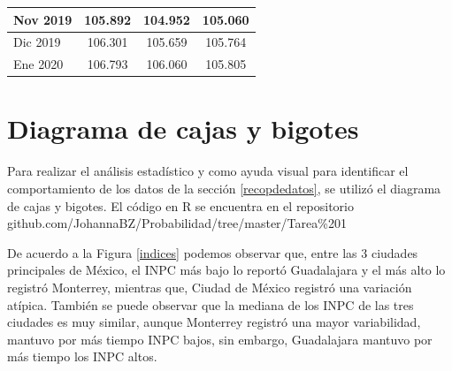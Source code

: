 \documentclass[fontsize=12pt]{article}
\begin{document}
\begin{table}[htp]
\begin{tabular}{|l|c|c|c|}
Nov 2019                             & 105.892            & 104.952                                                                                  & 105.060              \\ \hline
Dic 2019                             & 106.301            & 105.659                                                                                  & 105.764              \\ \hline
Ene 2020                             & 106.793            & 106.060                                                                                  & 105.805              \\ \hline
\end{tabular}
\end{table}


\section{Diagrama de cajas y bigotes}
Para realizar el análisis estadístico y como ayuda visual para identificar el comportamiento de los datos de la sección \ref{recopdedatos}, se utilizó el diagrama de cajas y bigotes. El código en R se encuentra en el repositorio github.com/JohannaBZ/Probabilidad/tree/master/Tarea\%201

De acuerdo a la Figura \ref{indices} podemos observar que, entre las 3 ciudades principales de México, el INPC más bajo lo reportó Guadalajara y el más alto lo registró Monterrey, mientras que, Ciudad de México registró una variación atípica. También se puede observar que la mediana de los INPC de las tres ciudades es muy similar, aunque Monterrey registró una mayor variabilidad, mantuvo por más tiempo INPC bajos, sin embargo, Guadalajara mantuvo por más tiempo los INPC altos.
\end{document}
